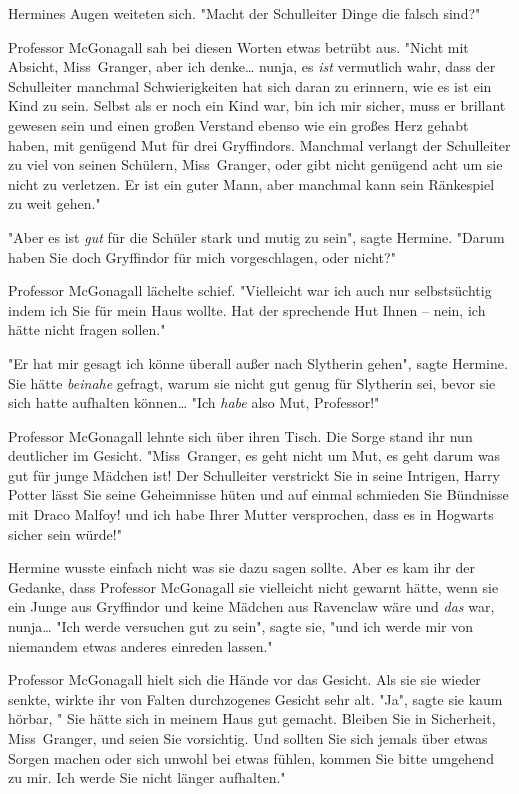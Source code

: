 {Hermines Augen weiteten sich. "Macht der Schulleiter Dinge die falsch sind?"

Professor McGonagall sah bei diesen Worten etwas betrübt aus. "Nicht mit Absicht, Miss~Granger, aber ich denke… nunja, es \emph{ist} vermutlich wahr, dass der Schulleiter manchmal Schwierigkeiten hat sich daran zu erinnern, wie es ist ein Kind zu sein. Selbst als er noch ein Kind war, bin ich mir sicher, muss er brillant gewesen sein und einen großen Verstand ebenso wie ein großes Herz gehabt haben, mit genügend Mut für drei Gryffindors. Manchmal verlangt der Schulleiter zu viel von seinen Schülern, Miss~Granger, oder gibt nicht genügend acht um sie nicht zu verletzen. Er ist ein guter Mann, aber manchmal kann sein Ränkespiel zu weit gehen."

"Aber es ist \emph{gut} für die Schüler stark und mutig zu sein", sagte Hermine. "Darum haben Sie doch Gryffindor für mich vorgeschlagen, oder nicht?"

Professor McGonagall lächelte schief. "Vielleicht war ich auch nur selbstsüchtig indem ich Sie für mein Haus wollte. Hat der sprechende Hut Ihnen -- nein, ich hätte nicht fragen sollen."

"Er hat mir gesagt ich könne überall außer nach Slytherin gehen", sagte Hermine. Sie hätte \emph{beinahe} gefragt, warum sie nicht gut genug für Slytherin sei, bevor sie sich hatte aufhalten können… "Ich \emph{habe} also Mut, Professor!"

Professor McGonagall lehnte sich über ihren Tisch. Die Sorge stand ihr nun deutlicher im Gesicht. "Miss~Granger, es geht nicht um Mut, es geht darum was gut für junge Mädchen ist! Der Schulleiter verstrickt Sie in seine Intrigen, Harry Potter lässt Sie seine Geheimnisse hüten und auf einmal schmieden Sie Bündnisse mit Draco Malfoy! und ich habe Ihrer Mutter versprochen, dass es in Hogwarts sicher sein würde!"

Hermine wusste einfach nicht was sie dazu sagen sollte. Aber es kam ihr der Gedanke, dass Professor McGonagall sie vielleicht nicht gewarnt hätte, wenn sie ein Junge aus Gryffindor und keine Mädchen aus Ravenclaw wäre und \emph{das} war, nunja… "Ich werde versuchen gut zu sein", sagte sie, "und ich werde mir von niemandem etwas anderes einreden lassen."

Professor McGonagall hielt sich die Hände vor das Gesicht. Als sie sie wieder senkte, wirkte ihr von Falten durchzogenes Gesicht sehr alt. "Ja", sagte sie kaum hörbar, " Sie hätte sich in meinem Haus gut gemacht. Bleiben Sie in Sicherheit, Miss~Granger, und seien Sie vorsichtig. Und sollten Sie sich jemals über etwas Sorgen machen oder sich unwohl bei etwas fühlen, kommen Sie bitte umgehend zu mir. Ich werde Sie nicht länger aufhalten."

}
